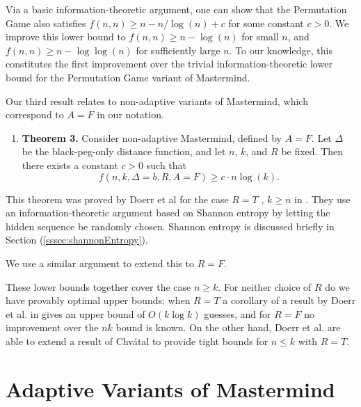 \documentclass[12pt, a4paper]{article}
\begin{document}
Via a basic information-theoretic argument, one can show that the Permutation Game also satisfies $f(n, n)\ge n - n/\log(n) + c$ for some constant $c>0$. We improve this lower bound to $f(n, n)\ge n - \log(n)$ for small $n$, and $f(n, n)\ge n- \log \log(n)$ for sufficiently large $n$. To our knowledge, this constitutes the first improvement over the trivial information-theoretic lower bound for the Permutation Game variant of Mastermind.

Our third result relates to non-adaptive variants of Mastermind, which correspond to $A=F$ in our notation.
\begin{enumerate}[label=]
	\item\textbf{Theorem 3.} Consider non-adaptive Mastermind, defined by $A=F$. Let $\Delta$ be the black-peg-only distance function, and let $n$, $k$, and $R$ be fixed. Then there exists a constant $c>0$ such that
	\begin{equation*}
		f(n, k, \Delta = b, R, A=F)\ge c\cdot n\log(k).
	\end{equation*}
\end{enumerate}
This theorem was proved by Doerr et al for the case $R = T$ , $k \ge n$ in \cite{DS13}. They use an information-theoretic argument based on Shannon entropy by letting the hidden sequence be randomly chosen. Shannon entropy is discussed briefly in Section (\ref{sssec:shannonEntropy}).

We use a similar argument to extend this to $R = F$. 

These lower bounds together cover the case $n \geq k$. For neither choice of $R$ do we have provably optimal upper bounds; when $R = T$ a corollary of a result by Doerr et al. in \cite{DS13} gives an upper bound of $O(k \log k)$ guesses, and for $R = F$ no improvement over the $nk$ bound is known. On the other hand, Doerr et al. are able to extend a result of Chv\'atal to provide tight bounds for $n \le k$ with $R = T$.

\section{Adaptive Variants of Mastermind}
\end{document}
